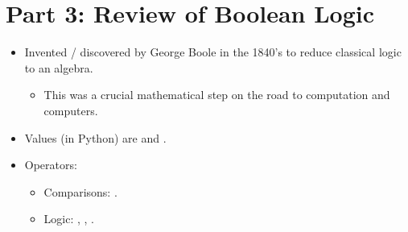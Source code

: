 \documentclass[letterpaper,10pt,english]{sphinxmanual}
\begin{document}
\section{Part 3:  Review of Boolean Logic}
\label{\detokenize{lecture_notes/lec11_conditionals2:part-3-review-of-boolean-logic}}\begin{itemize}
\item {} 
Invented / discovered by George Boole in the 1840’s to reduce
classical logic to an algebra.
\begin{itemize}
\item {} 
This was a crucial mathematical step on the road to computation
and computers.

\end{itemize}

\item {} 
Values (in Python) are  and .

\item {} 
Operators:
\begin{itemize}
\item {} 
Comparisons: \sphinxcode{\sphinxupquote{\textless{}, \textgreater{}, \textless{}=, \textgreater{}=, == !=}}.

\item {} 
Logic: , , .

\end{itemize}

\end{itemize}
\end{document}

